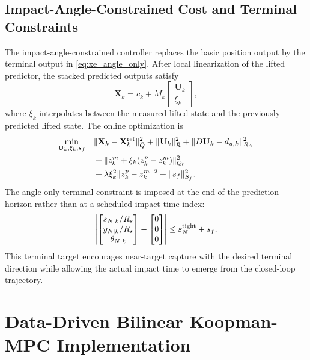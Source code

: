 \documentclass[letterpaper,journal]{IEEEtran}
\begin{document}
\subsection{Impact-Angle-Constrained Cost and Terminal Constraints}
The impact-angle-constrained controller replaces the basic position output by the terminal output in \eqref{eq:xe_angle_only}. After local linearization of the lifted predictor, the stacked predicted outputs satisfy
\begin{equation}
    \mathbf X_k=c_k+M_k
    \begin{bmatrix}
    \mathbf U_k\\ \xi_k
    \end{bmatrix},
\end{equation}
where $\xi_k$ interpolates between the measured lifted state and the previously predicted lifted state. The online optimization is
\begin{align}
    \min_{\mathbf U_k,\xi_k,s_f}\quad
    &\|\mathbf X_k-\mathbf X_k^{\rm ref}\|_{\bar Q}^2
    +\|\mathbf U_k\|_{\bar R}^2
    +\|D\mathbf U_k-d_{u,k}\|_{R_\Delta}^2 \nonumber\\
    &+\|z_k^m+\xi_k(z_k^p-z_k^m)\|_{Q_0}^2 \nonumber\\
    &+\lambda \xi_k^2\|z_k^p-z_k^m\|^2
    +\|s_f\|_{S_f}^2 .
    \label{eq:qp_cost_angle_only}
\end{align}
The angle-only terminal constraint is imposed at the end of the prediction horizon rather than at a scheduled impact-time index:
\begin{equation}
    \left|
    \begin{bmatrix}
    s_{N|k}/R_s\\ y_{N|k}/R_s\\ \theta_{N|k}
    \end{bmatrix}
    -
    \begin{bmatrix}
    0\\0\\0
    \end{bmatrix}
    \right|
    \le \varepsilon_N^{\rm tight}+s_f .
    \label{eq:angle_only_terminal_constraint}
\end{equation}
This terminal target encourages near-target capture with the desired terminal direction while allowing the actual impact time to emerge from the closed-loop trajectory.

\section{Data-Driven Bilinear Koopman-MPC Implementation}
\end{document}
